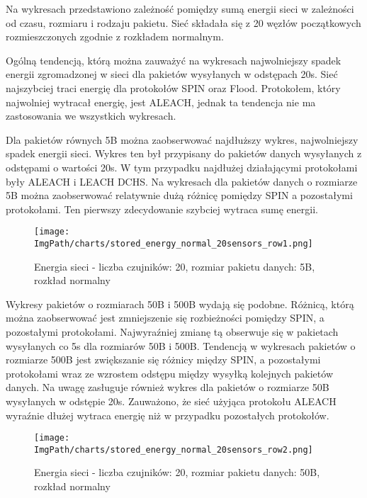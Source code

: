 Na wykresach przedstawiono zależność pomiędzy sumą energii sieci w zależności od czasu, rozmiaru  i rodzaju pakietu. Sieć składała się z 20 węzłów początkowych rozmieszczonych zgodnie z rozkładem normalnym.
  
Ogólną tendencją, którą można zauważyć na wykresach najwolniejszy spadek energii zgromadzonej w sieci dla pakietów wysyłanych w odstępach 20s. Sieć najszybciej traci energię dla protokołów SPIN oraz Flood. Protokołem, który najwolniej wytracał energię, jest ALEACH, jednak ta tendencja nie ma zastosowania we wszystkich wykresach.

Dla pakietów równych 5B można zaobserwować najdłuższy wykres, najwolniejszy spadek energii sieci. Wykres ten był przypisany do pakietów danych wysyłanych z odstępami o wartości 20s. W tym przypadku najdłużej działającymi protokołami były ALEACH i LEACH DCHS. Na wykresach dla pakietów danych o rozmiarze 5B można zaobserwować relatywnie dużą różnicę pomiędzy SPIN a pozostałymi protokołami. Ten pierwszy zdecydowanie szybciej wytraca sumę energii.

\begin{figure}[H]
	\begin{center}
		\texttt{[image: \\ImgPath/charts/stored\_energy\_normal\_20sensors\_row1.png]}
	\end{center}
	\caption{Energia sieci - liczba czujników: 20, rozmiar pakietu danych: 5B, rozkład normalny}
\end{figure}

Wykresy pakietów o rozmiarach 50B i 500B wydają się podobne. Różnicą, którą można zaobserwować jest zmniejszenie się rozbieżności pomiędzy SPIN, a pozostałymi protokołami. Najwyraźniej zmianę tą obserwuje się w pakietach wysyłanych co 5s dla rozmiarów 50B i 500B. Tendencją w wykresach pakietów o rozmiarze 500B jest zwiększanie się różnicy między SPIN, a pozostałymi protokołami wraz ze wzrostem odstępu między wysyłką kolejnych pakietów danych. Na uwagę zasługuje również wykres dla pakietów o rozmiarze 50B wysyłanych w odstępie 20s. Zauważono, że sieć użyjąca protokołu ALEACH wyraźnie dłużej wytraca energię niż w przypadku pozostałych protokołów. 

\begin{figure}[H]
	\begin{center}
		\texttt{[image: \\ImgPath/charts/stored\_energy\_normal\_20sensors\_row2.png]}
	\end{center}
	\caption{Energia sieci - liczba czujników: 20, rozmiar pakietu danych: 50B, rozkład normalny}
\end{figure}

